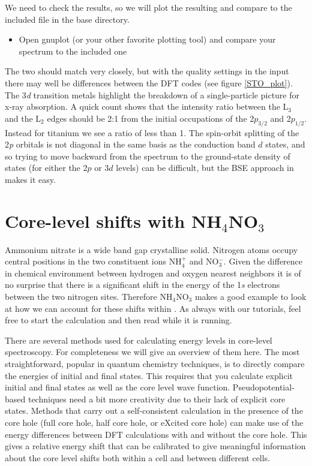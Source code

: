 \documentclass[11pt]{report}
\begin{document}
We need to check the results, so we will plot the resulting  and compare to the included  file in the base  directory.
\begin{itemize}
\item Open gnuplot (or your other favorite plotting tool) and compare your spectrum to the included one
\end{itemize}
The two should match very closely, but with the quality settings in the input there may well be differences between the DFT codes (see figure \ref{STO_plot}). The 3{\it d} transition metals highlight the breakdown of a single-particle picture for x-ray absorption. A quick count shows that the intensity ratio between the L$_3$ and the L$_2$ edges should be 2:1 from the initial occupations of the 2$p_{3/2}$ and 2$p_{1/2}$. Instead for titanium we see a ratio of less than 1. The spin-orbit splitting of the 2{\it p} orbitals is not diagonal in the same basis as the conduction band $d$ states, and so trying to move backward from the spectrum to the ground-state density of states (for either the 2$p$ or 3$d$ levels) can be difficult, but the BSE approach in  makes it easy.

\section{Core-level shifts with NH$_4$NO$_3$}

Ammonium nitrate is a wide band gap crystalline solid. Nitrogen atoms occupy central positions in the two constituent ions NH$_4^+$ and NO$_3^-$. Given the difference in chemical environment between hydrogen and oxygen nearest neighbors it is of no surprise that there is a significant shift in the energy of the 1{\it s} electrons between the two nitrogen sites. Therefore NH$_4$NO$_3$ makes a good example to look at how we can account for these shifts within . As always with our tutorials, feel free to start the calculation  and then read while it is running.

There are several methods used for calculating energy levels in core-level spectroscopy. For completeness we will give an overview of them here. The most straightforward, popular in quantum chemistry techniques, is to directly compare the energies of initial and final states. This requires that you calculate explicit initial and final states as well as the core level wave function. Pseudopotential-based techniques need a bit more creativity due to their lack of explicit core states. Methods that carry out a self-consistent calculation in the presence of the core hole (full core hole, half core hole, or eXcited core hole) can make use of the energy differences between DFT calculations with and without the core hole. This gives a relative energy shift that can be calibrated to give meaningful information about the core level shifts both within a cell and between different cells.\cite{NeedCites}
\end{document}
